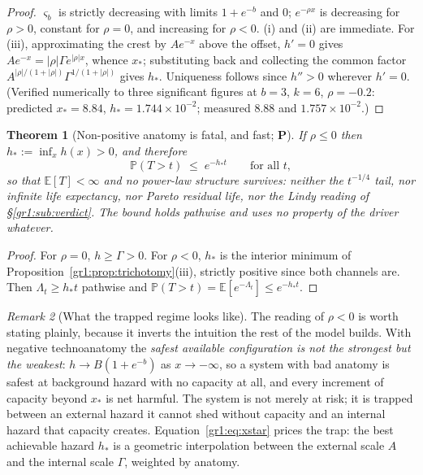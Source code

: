\documentclass[11pt]{article}
\numberwithin{equation}{section}
\theoremstyle{plain}
\newtheorem{theorem}{Theorem}[section]
\theoremstyle{definition}
\theoremstyle{remark}
\newtheorem{remark}[theorem]{Remark}
\newcommand{\E}{\mathbb{E}}
\newcommand{\PP}{\mathbb{P}}
\begin{document}
\begin{proof}
$\varsigma_b$ is strictly decreasing with limits $1+e^{-b}$ and $0$;
$e^{-\rho x}$ is decreasing for $\rho>0$, constant for $\rho=0$, and
increasing for $\rho<0$. (i) and (ii) are immediate. For (iii),
approximating the crest by $Ae^{-x}$ above the offset, $h'=0$ gives
$Ae^{-x}=|\rho|\Gamma e^{|\rho|x}$, whence $x_\ast$; substituting back
and collecting the common factor
$A^{|\rho|/(1+|\rho|)}\Gamma^{1/(1+|\rho|)}$ gives $h_\ast$. Uniqueness
follows since $h''>0$ wherever $h'=0$. (Verified numerically to three
significant figures at $b=3$, $k=6$, $\rho=-0.2$: predicted
$x_\ast=8.84$, $h_\ast=1.744\times10^{-2}$; measured $8.88$ and
$1.757\times10^{-2}$.)
\end{proof}

\begin{theorem}[Non-positive anatomy is fatal, and fast; \textbf{P}]
\label{gr1:thm:trapped}
If $\rho\le0$ then $h_\ast:=\inf_x h(x)>0$, and therefore
\begin{equation}\label{gr1:eq:trappedtail}
\PP(T>t)\;\le\;e^{-h_\ast t}\qquad\text{for all }t,
\end{equation}
so that $\E[T]<\infty$ and \emph{no power-law structure survives}:
neither the $t^{-1/4}$ tail, nor infinite life expectancy, nor Pareto
residual life, nor the Lindy reading of
\S\ref{gr1:sub:verdict}. The bound holds pathwise and uses no property
of the driver whatever.
\end{theorem}

\begin{proof}
For $\rho=0$, $h\ge\Gamma>0$. For $\rho<0$, $h_\ast$ is the interior
minimum of Proposition~\ref{gr1:prop:trichotomy}(iii), strictly positive
since both channels are. Then $\Lambda_t\ge h_\ast t$ pathwise and
$\PP(T>t)=\E[e^{-\Lambda_t}]\le e^{-h_\ast t}$.
\end{proof}

\begin{remark}[What the trapped regime looks like]
\label{gr1:rem:trapped}
The reading of $\rho<0$ is worth stating plainly, because it inverts the
intuition the rest of the model builds. With negative technoanatomy the
\emph{safest available configuration is not the strongest but the
weakest}: $h\to B(1+e^{-b})$ as $x\to-\infty$, so a system with bad
anatomy is safest at background hazard with no capacity at all, and
every increment of capacity beyond $x_\ast$ is net harmful. The system
is not merely at risk; it is trapped between an external hazard it
cannot shed without capacity and an internal hazard that capacity
creates. Equation~\eqref{gr1:eq:xstar} prices the trap: the best
achievable hazard $h_\ast$ is a geometric interpolation between the
external scale $A$ and the internal scale $\Gamma$, weighted by anatomy.
\end{remark}
\end{document}
